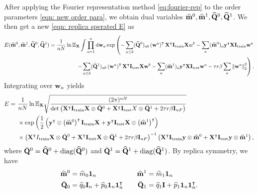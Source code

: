 \documentclass[9pt,twocolumn]{pnas-new}
\begin{document}
After applying the Fourier representation method \eqref{eq:fourier-rep} to the order parameters \eqref{eqn: new order para}, we obtain dual variables $\widehat{\mathbf{m}}^0,\widehat{\mathbf{m}}^1,\widehat{\mathbf{Q}}^0,\widehat{\mathbf{Q}}^1$. We then get a new \eqref{eqn: replica sperated E} as
\begin{equation*}
\begin{aligned}
    E(\widehat{\mathbf{m}}^0,\widehat{\mathbf{m}}^1,\widehat{\mathbf{Q}}^0,\widehat{\mathbf{Q}}^1)=\frac{1}{nN}\ln \mathbb{E}_{\mathbf{X}}\int\prod_{a=1}^{n}\mathrm{d}\mathbf{w}_{a}\exp\left(-\sum_{a\leq b}(\widehat{\mathbf{Q}}^0)_{ab}\left(\mathbf{w}^{a}\right)^{\intercal}\mathbf{X}^{\intercal}\mathbf{I}_{\text{train}}\mathbf{X} w^{b} -\sum_{a}(\widehat{\mathbf{m}}^0)_{a}\mathbf{y}^{\intercal}\mathbf{X}\mathbf{I}_{\text{train}} \mathbf{w}^{a} \right.\\\left. -\sum_{a\leq b}(\widehat{\mathbf{Q}}^1)_{ab}\left(\mathbf{w}^{a}\right)^{\intercal}\mathbf{X}^{\intercal}\mathbf{I}_{\text{test}}\mathbf{X} \mathbf{w}^{b} -\sum_{a}(\widehat{\mathbf{m}}^1)_{a}\mathbf{y}^{\intercal}\mathbf{X}\mathbf{I}_{\text{test}}\mathbf{w}^{a}-\tau r\beta \sum_a \left\lVert\mathbf{w}^a\right\rVert_2^2\right).
    \end{aligned}
\end{equation*}
Integrating over $\mathbf{w}_a$ yields
\begin{equation}\label{APP: E selfloop}
\begin{aligned}
    E=&~ \frac{1}{nN}\ln \mathbb{E}_{\mathbf{X}} \sqrt{\frac{(2\pi)^{n N}}{\mathrm{det}\left(\mathbf{X}^{\intercal} \mathbf{I}_{\text{train}}\mathbf{X} \otimes \bar{\mathbf{Q}}^{0}+\mathbf{X}^{\intercal} \mathbf{I}_{\text{test}}X\otimes\bar{\mathbf{Q}}^{1}+2\tau r\beta \mathbf{I}_{n F}\right)}}\\
    & ~ \times \exp\left(\frac{1}{2}\left(\mathbf{y}^{\intercal} \otimes\left(\widehat{\mathbf{m}}^{0}\right)^{\intercal}  \mathbf{I}_{\text{train}}\mathbf{X}+ \mathbf{y}^{\intercal} \mathbf{I}_{\text{test}}\mathbf{X} \otimes \left(\widehat{\mathbf{m}}^{1}\right)^{\intercal} \right) \right.\\
    & ~ \times\left(\mathbf{X}^{\intercal} I_{\text{train}}\mathbf{X} \otimes  \bar{\mathbf{Q}}^{0}+\mathbf{X}^{\intercal} \mathbf{I}_{\text{test}}\mathbf{X} \otimes \bar{\mathbf{Q}}^{1} +2\tau r\beta \mathbf{I}_{nF}\right)^{-1}  \left(\mathbf{X}^{\intercal} \mathbf{I}_{\text{train}}\mathbf{y} \otimes \widehat{\mathbf{m}}^{0}+\mathbf{X}^{\intercal} \mathbf{I}_{\text{test}}\mathbf{y}\otimes\widehat{\mathbf{m}}^{1}\right),
\end{aligned}
\end{equation}
where $\bar{\mathbf{Q}}^0=\widehat{\mathbf{Q}}^0+\mathrm{diag}(\widehat{\mathbf{Q}}^0)$ and $\bar{\mathbf{Q}}^1=\widehat{\mathbf{Q}}^1+\mathrm{diag}(\widehat{\mathbf{Q}}^1)$. By replica symmetry, we have
\begin{equation}
\begin{aligned}
        \widehat{\mathbf{m}}^0&=\widehat{m}_0\boldsymbol{1}_n \quad &\widehat{\mathbf{m}}^1&=\widehat{m}_1\boldsymbol{1}_n\\
        \bar{\mathbf{Q}}_0&=\widehat{q}_0\mathbf{I}_n+ \widehat{p}_0 \boldsymbol{1}_n \boldsymbol{1}^\intercal_n \quad &\bar{\mathbf{Q}}_1&=\widehat{q}_1\mathbf{I}+ \widehat{p}_1 \boldsymbol{1}_n \boldsymbol{1}_n^\intercal.\\
\end{aligned}
\end{equation}
\end{document}
